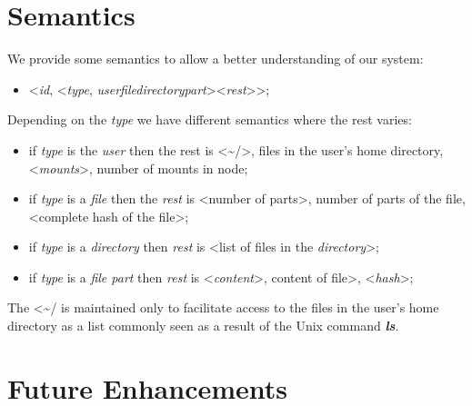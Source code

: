 \documentclass[times,9pt,article]{llncs}
\begin{document}
\section{Semantics}
We provide some semantics to allow a better understanding of our system:
\begin{itemize}
\item \textless \emph{id}, \textless \emph{type}, \emph{user}\textbar \emph{file}\textbar \emph{directory}\textbar \emph{part}\textgreater \textless \emph{rest}\textgreater\textgreater ;
\end{itemize}
Depending on the \emph{type} we have different semantics where the rest varies:
\begin{itemize}
\item if \emph{type} is the \emph{user} then the  rest is \textless \textasciitilde /\textgreater, files in the user's home directory, \textless \emph{mounts}\textgreater, number of mounts in node;
\item if \emph{type} is a \emph{file} then the  \emph{rest} is \textless number of parts\textgreater , number of parts of the file, \textless complete hash of the file\textgreater;
\item if \emph{type} is a \emph{directory} then \emph{rest} is \textless list of files in the \emph{directory}\textgreater;
\item if \emph{type} is a \emph{file part} then \emph{rest} is \textless \emph{content}\textgreater , content of file\textgreater , \textless \emph{hash}\textgreater;
\end{itemize}
The \textless \textasciitilde / is maintained only to facilitate access to the files in the user's home directory as a list commonly seen as a result of the Unix command \textbf{\emph{ls}}.

\section{Future Enhancements}
\end{document}
